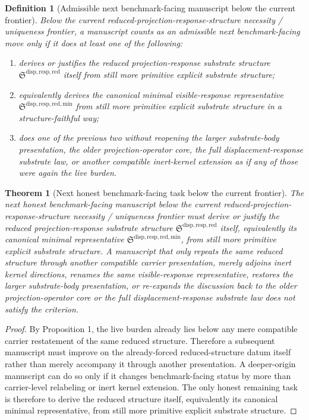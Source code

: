 \documentclass[11pt]{article}
\newcommand{\ReducedStructure}{\mathfrak S^{\mathrm{disp,resp,red}}}
\newcommand{\MinimalReducedStructure}{\mathfrak S^{\mathrm{disp,resp,red,min}}}
\newtheorem{definition}{Definition}
\newtheorem{theorem}{Theorem}
\begin{document}
\begin{definition}[Admissible next benchmark-facing manuscript below the current frontier]
Below the current reduced-projection-response-structure necessity / uniqueness frontier, a manuscript counts as an admissible next benchmark-facing move only if it does at least one of the following:
\begin{enumerate}
    \item derives or justifies the reduced projection-response substrate structure \(\ReducedStructure\) itself from still more primitive explicit substrate structure;
    \item equivalently derives the canonical minimal visible-response representative \(\MinimalReducedStructure\) from still more primitive explicit substrate structure in a structure-faithful way;
    \item does one of the previous two without reopening the larger substrate-body presentation, the older projection-operator core, the full displacement-response substrate law, or another compatible inert-kernel extension as if any of those were again the live burden.
\end{enumerate}
\end{definition}

\begin{theorem}[Next honest benchmark-facing task below the current frontier]
The next honest benchmark-facing manuscript below the current reduced-projection-response-structure necessity / uniqueness frontier must derive or justify the reduced projection-response substrate structure \(\ReducedStructure\) itself, equivalently its canonical minimal representative \(\MinimalReducedStructure\), from still more primitive explicit substrate structure. A manuscript that only repeats the same reduced structure through another compatible carrier presentation, merely adjoins inert kernel directions, renames the same visible-response representative, restores the larger substrate-body presentation, or re-expands the discussion back to the older projection-operator core or the full displacement-response substrate law does not satisfy the criterion.
\end{theorem}

\begin{proof}
By Proposition 1, the live burden already lies below any mere compatible carrier restatement of the same reduced structure. Therefore a subsequent manuscript must improve on the already-forced reduced-structure datum itself rather than merely accompany it through another presentation. A deeper-origin manuscript can do so only if it changes benchmark-facing status by more than carrier-level relabeling or inert kernel extension. The only honest remaining task is therefore to derive the reduced structure itself, equivalently its canonical minimal representative, from still more primitive explicit substrate structure.
\end{proof}
\end{document}
